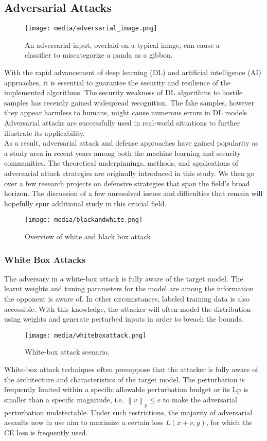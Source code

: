 \documentclass[ 12pt,a4paper,twocolumn,fleqn]{article}
\begin{document}
\subsection{Adversarial Attacks}
\begin{figure}[H]
\texttt{[image: media/adversarial\_image.png]}
\centering
\caption{An adversarial input, overlaid on a typical image, can cause a classifier to miscategorize a panda as a gibbon.}
\end{figure}
With the rapid advancement of deep learning (DL) and artificial intelligence (AI) approaches, it is essential to guarantee the security and resilience of the implemented algorithms. The security weakness of DL algorithms to hostile samples has recently gained widespread recognition. The fake samples, however they appear harmless to humans, might cause numerous errors in DL models. Adversarial attacks are successfully used in real-world situations to further illustrate its applicability.\\
%
As a result, adversarial attack and defense approaches have gained popularity as a study area in recent years among both the machine learning and security communities. The theoretical underpinnings, methods, and applications of adversarial attack strategies are originally introduced in this study. We then go over a few research projects on defensive strategies that span the field's broad horizon. The discussion of a few unresolved issues and difficulties that remain will hopefully spur additional study in this crucial field.\\
\begin{figure}[H]
\texttt{[image: media/blackandwhite.png]}
\centering
\caption{Overview of white and black box attack}
\end{figure}
\subsubsection{White Box Attacks}
The adversary in a white-box attack is fully aware of the target model. The learnt weights and tuning parameters for the model are among the information the opponent is aware of. In other circumstances, labeled training data is also accessible. With this knowledge, the attacker will often model the distribution using weights and generate perturbed inputs in order to breach the bounds.\\
\begin{figure}[H]
\texttt{[image: media/whiteboxattack.png]}
\centering
\caption{White-box attack scenario.}
\end{figure}
%
White-box attack techniques often presuppose that the attacker is fully aware of the architecture and characteristics of the target model. The perturbation is frequently limited within a specific allowable perturbation budget or its Lp is smaller than a specific magnitude, i.e. $  \left \| v \right \|_{p} \leq e $
 to make the adversarial perturbation undetectable. Under such restrictions, the majority of adversarial assaults now in use aim to maximize a certain loss $L(x+v,y)$, for which the CE loss is frequently used.\\
\end{document}
